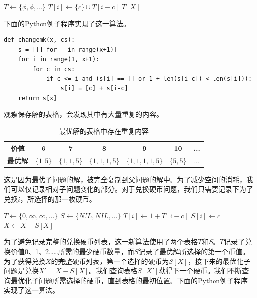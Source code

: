 \documentclass[b5paper]{ctexart}
\begin{document}
\begin{algorithmic}[1]
  \State $T \gets \{ \phi, \phi, ... \}$
        \State $T[i] \gets \{ c \} \cup T[i-c]$
      \EndIf
    \EndFor
  \EndFor
  \State \Return $T[X]$
\EndFunction
\end{algorithmic}

下面的Python例子程序实现了这一算法。

\lstset{language=Python}
\begin{lstlisting}
def changemk(x, cs):
    s = [[] for _ in range(x+1)]
    for i in range(1, x+1):
        for c in cs:
            if c <= i and (s[i] == [] or 1 + len(s[i-c]) < len(s[i])):
                s[i] = [c] + s[i-c]
    return s[x]
\end{lstlisting}

观察保存解的表格，会发现其中有大量重复的内容。

\begin{table}[htbp]
\centering
\begin{tabular}{c||c|c|c|c|c|c|}
\hline
价值 & 6 & 7 & 8 & 9 & 10 & ... \\
\hline
最优解 & $\{ 1, 5 \}$ & $\{1, 1, 5\}$ & $\{1, 1, 1, 5\}$ & $\{1, 1, 1, 1, 5\}$ & $\{ 5, 5 \}$ & ... \\
\hline
\end{tabular}
\caption{最优解的表格中存在重复内容} %
\end{table}

这是因为最优子问题的解，被完全复制到父问题的解中。为了减少空间的消耗，我们可以仅记录相对子问题变化的部分。对于兑换硬币问题，我们只需要记录下为了兑换$i$，所选择的那一枚硬币。

\begin{algorithmic}[1]
  \State $T \gets \{ 0, \infty, \infty, ... \}$
  \State $S \gets \{ NIL, NIL, ... \}$
        \State $T[i] \gets 1 + T[i-c]$
        \State $S[i] \gets c$
      \EndIf
    \EndFor
  \EndFor
    \State {}
    \State $X \gets X - S[X]$
  \EndWhile
\EndFunction
\end{algorithmic}

为了避免记录完整的兑换硬币列表，这一新算法使用了两个表格$T$和$S$。$T$记录了兑换价值0、1、2……所需的最少硬币数量，而$S$记录了最优解所选择的第一个币值。为了获得兑换$X$的完整硬币列表，第一个选择的硬币为$S[X]$，接下来的最优化子问题是兑换$X' = X - S[X]$。我们查询表格$S[X']$获得下一个硬币。我们不断查询最优化子问题所需选择的硬币，直到表格的最初位置。下面的Python例子程序实现了这一算法。
\end{document}
